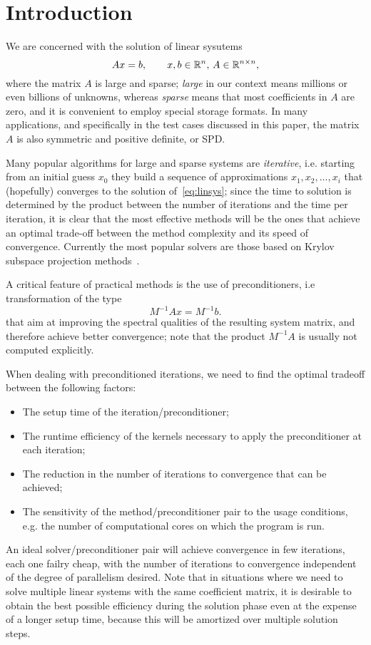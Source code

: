 \section{Introduction}


We are concerned with the solution of linear sysutems 
 \begin{equation}
 Ax = b, \qquad x,b \in \Bbb{R}^n,\, A\in \Bbb{R}^{n\times n},
\label{eq:linsys}
\end{equation}
where the matrix $A$ is large and sparse;  \emph{large}  in our
context means millions or even billions of unknowns, whereas
\emph{sparse} means that most coefficients in $A$ are zero, and it is
convenient to employ special storage formats. In many applications,
and specifically in the test cases discussed in this paper, the matrix
$A$ is also symmetric and positive definite, or SPD. 

Many popular algorithms for large and sparse systems are
\emph{iterative}, i.e. starting from an initial guess $x_0$ they build
a sequence of approximations  $x_1,x_2,\dots,x_i$ that (hopefully)
converges to the solution of~\ref{eq:linsys}; since the time to
solution is determined by the product between the number of iterations
and the time per iteration, it is clear that the most effective
methods will be the ones that achieve an optimal trade-off between the
method complexity and its speed of convergence. Currently the most
popular solvers  are those based on  Krylov subspace 
projection methods~\cite{MR1990645}. 

A critical feature of practical methods is the use of preconditioners,
i.e transformation of the type 
\begin{equation}\label{eq:preclinsys}
M^{-1}Ax=M^{-1}b.
\end{equation} 
that aim at improving the spectral qualities of the resulting system
matrix, and therefore achieve better convergence; note that the
product $M^{-1}A$ is usually  not computed explicitly. 

When dealing with preconditioned iterations, we need to find the
optimal tradeoff between the following factors:
\begin{itemize}
\item The setup time of the iteration/preconditioner;
\item The runtime  efficiency of the kernels necessary to apply the 
  preconditioner at each iteration; 
\item The reduction in the number of iterations to convergence that
  can be achieved;
\item The sensitivity of the method/preconditioner pair to the usage
  conditions, e.g. the number of computational cores on which the
  program is run. 
\end{itemize}
An ideal solver/preconditioner pair will achieve convergence in few
iterations, each one failry cheap, with the number of iterations to
convergence independent of the degree of parallelism desired. Note
that in situations where we need to solve multiple linear systems with
the same coefficient matrix, it is desirable to obtain the best
possible efficiency during the solution phase even at the expense of a
longer setup time, because this will be amortized over multiple
solution steps. 

